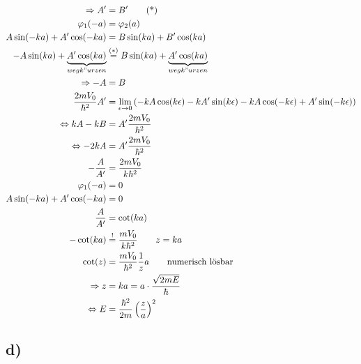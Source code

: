 \begin{align*}
        \Rightarrow A' &= B' \tag{*}\\
        \varphi_1(-a) &= \varphi_2(a)\\
        A\sin(-ka) + A'\cos(-ka) &= B\sin(ka) + B'\cos(ka) \\
        -A\sin(ka) + \underbrace{A'\cos(ka)}_{wegk"urzen} &\stackrel{(*)}{=} B\sin(ka) + \underbrace{A'\cos(ka)}_{wegk"urzen}\\
        \Rightarrow -A &= B\\
        \frac{2mV_0}{\hbar^2}A' &= \lim_{\epsilon \to 0} \left( -kA\cos(k\epsilon) - kA'\sin(k\epsilon) - kA\cos(-k\epsilon) + A'\sin(-k\epsilon) \right) \\
        \Leftrightarrow kA - kB &= A'\frac{2mV_0}{\hbar^2}\\
        \Leftrightarrow -2kA &= A'\frac{2mV_0}{\hbar^2}\\
        -\frac{A}{A'} &= \frac{2mV_0}{k\hbar^2}\\
        \varphi_1(-a) &= 0\\
        A\sin(-ka) + A'\cos(-ka) &= 0\\
        \frac{A}{A'} &= \cot(ka)\\
        -\cot(ka) &\stackrel{!}{=} \frac{mV_0}{k\hbar^2} \qquad z=ka\\
        \cot(z) &= \frac{mV_0}{\hbar^2} \frac{1}{z}a \qquad \text{numerisch lösbar}\\
        \Rightarrow z &= ka = a \cdot \frac{\sqrt{2mE}}{\hbar}\\
        \Leftrightarrow E &= \frac{\hbar^2}{2m} \left( \frac{z}{a} \right)^2
    \end{align*}

    \subsection{d)}

